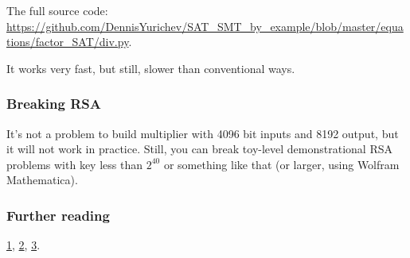 The full source code: \url{https://github.com/DennisYurichev/SAT_SMT_by_example/blob/master/equations/factor_SAT/div.py}.

It works very fast, but still, slower than conventional ways.

\subsubsection{Breaking \ac{RSA}}

It's not a problem to build multiplier with 4096 bit inputs and 8192 output, but it will not work in practice.
Still, you can break toy-level demonstrational RSA problems with key less than $2^{40}$ or something like that
(or larger, using Wolfram Mathematica).

\subsubsection{Further reading}

\href{https://yurichev.com/mirrors/SAT_factor/Encoding%20Basic%20Arithmetic%20Operations%20for%20SAT-Solvers.pdf}{1},
\href{https://yurichev.com/mirrors/SAT_factor/Factoring%20integers%20with%20parallel%20SAT%20solvers.pdf}{2},
\href{https://yurichev.com/mirrors/SAT_factor/Hard%20Instance%20Generation%20for%20SAT.pdf}{3}.

